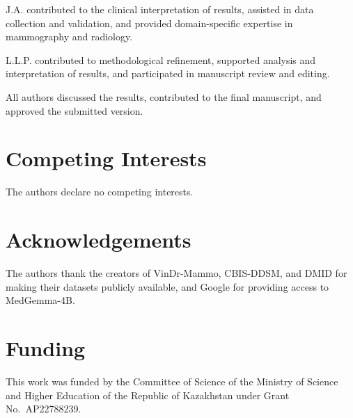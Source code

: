 \documentclass{wlscirep}
\begin{document}
J.A. contributed to the clinical interpretation of results, assisted in data collection and validation, and provided domain-specific expertise in mammography and radiology.
 
L.L.P. contributed to methodological refinement, supported analysis and interpretation of results, and participated in manuscript review and editing.
 
All authors discussed the results, contributed to the final manuscript, and approved the submitted version.

\section*{Competing Interests}

The authors declare no competing interests.

\section*{Acknowledgements}

The authors thank the creators of VinDr-Mammo, CBIS-DDSM, and DMID for making their datasets publicly available, and Google for providing access to MedGemma-4B.

\section*{Funding}

This work was funded by the Committee of Science of the Ministry of Science and Higher Education of the Republic of Kazakhstan under Grant No.\ AP22788239.


\end{document}
